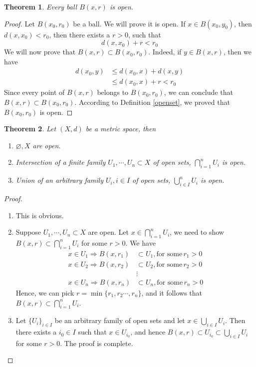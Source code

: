 \documentclass[12pt,leqno]{amsart}
\newtheorem{theorem}{Theorem}[section]
\theoremstyle{definition}
\numberwithin{equation}{subsection}
\begin{document}
\begin{theorem}
Every ball $B(x,r)$ is open.
\end{theorem}
\begin{proof}
Let $B(x_0,r_0)$ be a ball. We will prove it is open. If $x\in B(x_0, y_0)$, then $d(x, x_0)<r_0$, then there exists a $r>0$, such that $$d(x,x_0)+r < r_0$$
We will now prove that $B(x,r)\subset B(x_0,r_0)$. Indeed, if $y\in B(x,r)$, then we have 
\begin{align*}
    d(x_0,y) & \leq d(x_0,x) + d(x,y) \\
    & \leq d(x_0,x) + r < r_0
\end{align*}
Since every point of $B(x,r)$ belongs to $B(x_0,r_0)$, we can conclude that $B(x,r)\subset B(x_0,r_0)$. According to Definition \ref{openset}, we proved that $B(x_0,r_0)$ is open.
\end{proof}


\begin{theorem}
Let $(X,d)$ be a metric space, then
\begin{enumerate}
    \item $\varnothing, X$ are open.
    \item Intersection of a finite family $U_1, \cdots, U_n \subset X$ of open sets, $\bigcap^n_{i=1}U_i$ is open.
    \item Union of an arbitrary family $U_i,i\in I$ of open sets, $\bigcup^n_{i\in I}U_i$ is open.
\end{enumerate}
\end{theorem}
\begin{proof}
~\begin{enumerate}
    \item This is obvious.
    \item Suppose $U_1, \cdots, U_n \subset X$ are open. Let $x\in \bigcap^n_{i=1}U_i$, we need to show $B(x,r)\subset \bigcap^n_{i=1}U_i$ for some $r>0$. We have 
    \begin{align*}
        x\in U_1 \Rightarrow B(x,r_1) & \subset U_1, \text{for some} \, r_1 > 0 \\
        x\in U_2 \Rightarrow B(x,r_2) & \subset U_2, \text{for some} \, r_2 > 0 \\
        & \vdots \\
        x\in U_n \Rightarrow B(x,r_n) & \subset U_n, \text{for some} \, r_n > 0
    \end{align*}
    Hence, we can pick $r = \min\{r_1, r_2\cdots,r_n\}$, and it follows that $B(x,r) \subset \bigcap^n_{i=1}U_i$.
    \item Let $\{U_i\}_{i\in I}$ be an arbitrary family of open sets and let $x\in \bigcup_{i\in I}U_i$. Then there exists a $i_0\in I$ such that $x\in U_{i_0}$, and hence $B(x,r) \subset U_{i_0} \subset \bigcup_{i\in I}U_i$ for some $r>0$. The proof is complete.
\end{enumerate}
\end{proof}
\end{document}
